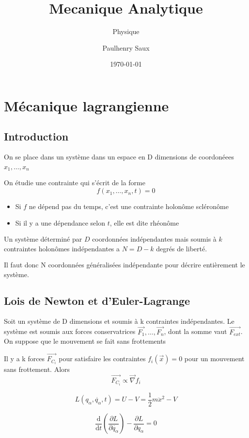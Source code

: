 \documentclass[french]{yLectureNote}
\title{Mecanique Analytique}
\subtitle{Physique}
\author{Paulhenry Saux}
\date{\today}
\renewcommand{\vec}{\overrightarrow}
\newcommand{\dd}{\mathrm{d}}
\begin{document}
\chapter{Mécanique lagrangienne}
\section{Introduction}
On se place dans un système dans un espace en D dimensions de coordonéees $x_1,\dots, x_n$
\begin{definition}
     On étudie une contrainte qui s'écrit de la forme $$f(x_1,\dots,x_n,t) = 0$$
    \begin{itemize}
        \item Si $f$ ne dépend pas du temps, c'est une contrainte holon\^ome scléron\^ome
        \item Si il y a une dépendance selon $t$, elle est dite rhéon\^ome
    \end{itemize}
\end{definition}
\begin{proposition}
    Un système déterminé par $D$ coordonnées indépendantes mais soumis à $k$ contraintes holonômes indépendantes
a $N = D - k$ degrés de liberté.
\end{proposition}
Il faut donc N coordonnées généralisées indépendante
pour décrire entièrement le système. 
\section{Lois de Newton et d'Euler-Lagrange}
Soit un système de D dimensions et soumis à k contraintes indépendantes. Le système est soumis aux forces conservatrices $\vec{F_1},\dots, \vec{F_n}$, dont la somme vaut $\vec{F_{ext}}$. On suppose que le mouvement se fait sans frottements
\begin{theorem}
    Il y a k forces $\vec{F_{C_i}}$ pour satisfaire les contraintes $f_i(\vec{x})=0$ pour un mouvement sans frottement. Alors 
    $$\vec{F_{C_i}}\propto \vec{\nabla}f_i$$
\end{theorem}
\begin{definition}[Lagrangien]
    $$L(q_{\alpha}, \dot{q_{\alpha}}, t) = U-V = \frac12 m\ddot{x}^2-V$$
\end{definition}
\begin{theorem}
    $$\frac{\dd }{\dd t}(\frac{\partial L}{\partial \dot{q_{\alpha}}})-\frac{\partial L}{\partial q_{\alpha}} = 0$$
\end{theorem}
\end{document}
